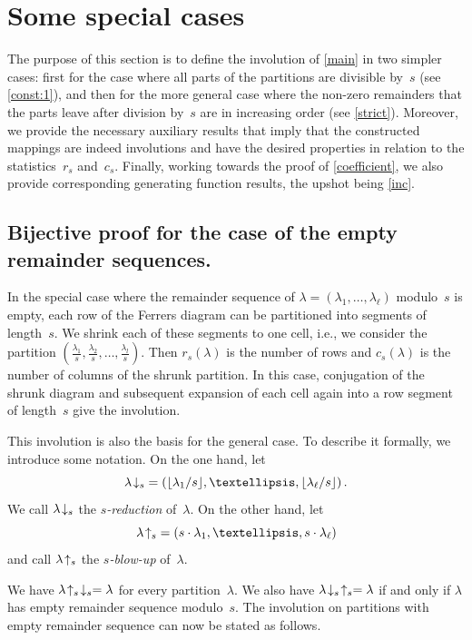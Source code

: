 \documentclass[12pt,reqno]{amsart}
\numberwithin{equation}{section}
\theoremstyle{definition}
\newcommand{\Dfn}[1]{\emph{\color{blue}#1}} %
\newcommand{\lab}[1]{\hbox{${\lambda}\!\downarrow_{#1}$}}
\newcommand{\lau}[1]{\hbox{${\lambda}\!\uparrow_{#1}$}}
\begin{document}
\section{Some special cases}
\label{sec:3}

The purpose of this section is to define the involution of \cref{main}
in two simpler cases: first for the case where all parts of the
partitions are divisible by~$s$ (see \cref{const:1}), and then for the
more general case where the non-zero remainders that the parts leave after
division by~$s$ are in increasing order (see \cref{strict}).
Moreover, we provide the necessary auxiliary results that imply that the
constructed mappings are indeed involutions and have the desired
properties in relation to the statistics~$r_s$ and~$c_s$.
Finally, working towards the proof of \cref{coefficient}, we also
provide corresponding generating function results, the upshot
being \cref{inc}.

\subsection{Bijective proof for the case of the empty remainder sequences.}
\label{sec:empty}
In the special case where the remainder sequence of $\lambda=(\lambda_1,\dots,\lambda_\ell)$ modulo~$s$ is empty, each row of the Ferrers diagram can be
partitioned into segments of length~$s$. We shrink each of these segments to one cell, i.e., we consider the partition
$(\frac{\lambda_1}{s},\frac{\lambda_2}{s},\dots,\frac{\lambda_l}{s})$. Then $r_s(\lambda)$ is the number of rows and $c_s(\lambda)$ is the number of columns of the shrunk partition. In this case, conjugation of the shrunk diagram and 
subsequent expansion of each cell again into
a row segment of length~$s$ give the involution.

This involution is also the basis for the general case.  To describe it
formally, we introduce some notation.  On the one hand, let
$$
\lab{s} =\left( \lfloor \lambda_1/s \rfloor, \dots,  \lfloor \lambda_\ell/s \rfloor \right).
$$
We call $\lab{s}$ the \Dfn{$s$-reduction} of~$\lambda$. On the other hand, let
$$
\lau{s} = \left( s \cdot \lambda_1,\dots,  s \cdot \lambda_\ell \right)
$$
and call $\lau{s}$  the \Dfn{$s$-blow-up} of~$\lambda$.

We have $\lau{s}\! \downarrow_s = \lambda$
for every partition~$\lambda$.  We also have
$\lab{s}\! \uparrow_s = \lambda$
if and only if $\lambda$ has empty remainder sequence modulo~$s$. 
{The involution on partitions with empty remainder sequence can now be stated as follows.}
\end{document}
